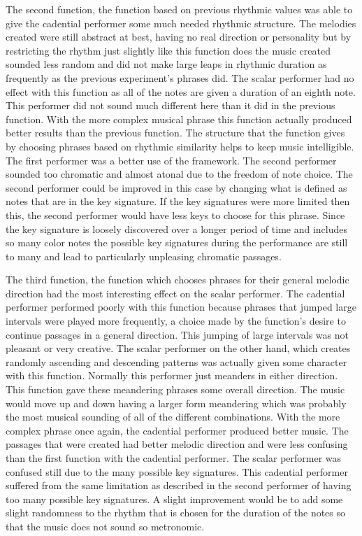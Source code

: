 \documentclass[12pt]{ucthesis}
\begin{document}
The second function, the function based on previous rhythmic values was able to give the cadential performer some much needed rhythmic structure. The melodies created were still abstract at best, having no real direction or personality but by restricting the rhythm just slightly like this function does the music created sounded less random and did not make large leaps in rhythmic duration as frequently as the previous experiment's phrases did. The scalar performer had no effect with this function as all of the notes are given a duration of an eighth note. This performer did not sound much different here than it did in the previous function. With the more complex musical phrase this function actually produced better results than the previous function. The structure that the function gives by choosing phrases based on rhythmic similarity helps to keep music intelligible. The first performer was a better use of the framework. The second performer sounded too chromatic and almost atonal due to the freedom of note choice. The second performer could be improved in this case by changing what is defined as notes that are in the key signature. If the key signatures were more limited then this, the second performer would have less keys to choose for this phrase. Since the key signature is loosely discovered over a longer period of time and includes so many color notes the possible key signatures during the performance are still to many and lead to particularly unpleasing chromatic passages.

The third function, the function which chooses phrases for their general melodic direction had the most interesting effect on the scalar performer. The cadential performer performed poorly with this function because phrases that jumped large intervals were played more frequently, a choice made by the function's desire to continue passages in a general direction. This jumping of large intervals was not pleasant or very creative. The scalar performer on the other hand, which creates randomly ascending and descending patterns was actually given some character with this function. Normally this performer just meanders in either direction. This function gave these meandering phrases some overall direction. The music would move up and down having a larger form meandering which was probably the most musical sounding of all of the different combinations. With the more complex phrase once again, the cadential performer produced better music. The passages that were created had better melodic direction and were less confusing than the first function with the cadential performer. The scalar performer was confused still due to the many possible key signatures. This cadential performer suffered from the same limitation as described in the second performer of having too many possible key signatures.  A slight improvement would be to add some slight randomness to the rhythm that is chosen for the duration of the notes so that the music does not sound so metronomic. 
\end{document}
